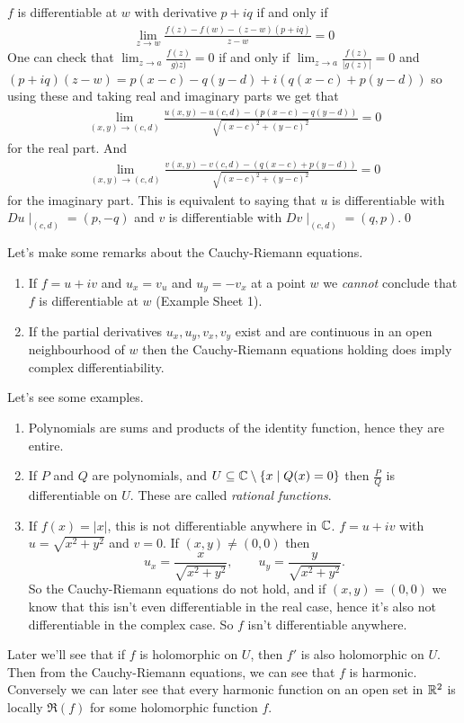 \documentclass{article}
\begin{document}
\pf $ f $ is differentiable at $ w $ with derivative $ p+iq $ if and only if
\begin{align*}
	\lim_{z\to w}\frac{f(z)-f(w) -(z-w)(p+iq)}{z-w} = 0
\end{align*}
One can check that $ \lim_{z\to a}\frac{f(z)}{g)z)}=0 $ if and only if $ \lim_{z\to a}\frac{f(z)}{|g(z)|} = 0 $ and $ (p+iq)(z-w) = p(x-c)-q(y-d)+i(q(x-c)+p(y-d)) $ so using these and taking real and imaginary parts we get that
\begin{align*}
	\lim_{(x,y)\to (c,d)} \frac{u(x,y)-u(c,d)-(p(x-c)-q(y-d))}{\sqrt{(x-c)^2+(y-c)^2}} = 0
\end{align*}
for the real part. And
\begin{align*}
	\lim_{(x,y)\to (c,d)}\frac{v(x,y)-v(c,d) - (q(x-c)+p(y-d))}{\sqrt{(x-c)^2+(y-c)^2}}=0
\end{align*}
for the imaginary part. This is equivalent to saying that $ u $ is differentiable with $ Du\mid_{(c,d)} = (p,-q) $ and $ v $ is differentiable with $ Dv\mid_{(c,d)} = (q,p) $.\qed
\begin{remark}
  Let's make some remarks about the Cauchy-Riemann equations.
  \begin{enumerate}
	  \item If $ f=u +iv $ and $ u_x=v_u $ and $ u_y = -v_x $ at a point $ w $ we \textit{cannot} conclude that $ f $ is differentiable at $ w $ (Example Sheet 1).
	  \item If the partial derivatives $ u_x,u_y,v_x,v_y $ exist and are continuous in an open neighbourhood of $ w $ then the Cauchy-Riemann equations holding does imply complex differentiability.
  \end{enumerate}
\end{remark}
Let's see some examples.
\begin{enumerate}
	\item Polynomials are sums and products of the identity function, hence they are entire.
	\item If $ P $ and $ Q $ are polynomials, and $ U\subseteq \mathbb{C}\setminus \{x\mid Q(x)= 0\} $ then $ \frac PQ $ is differentiable on $ U $. These are called \textit{rational functions}.
	\item If $ f(x)=|x| $, this is not differentiable anywhere in $ \mathbb{C} $. $ f=u+iv $ with $ u=\sqrt{x^2 +y^2} $ and $ v=0 $. If $ (x,y)\ne (0,0) $ then
		\[
			u_x=\frac{x}{\sqrt{x^2+y^2}}, \qquad u_y = \frac{y}{\sqrt{x^2+y^2}}.
		\]
		So the Cauchy-Riemann equations do not hold, and if $ (x,y)= (0,0) $ we know that this isn't even differentiable in the real case, hence it's also not differentiable in the complex case. So $ f $ isn't differentiable anywhere.
\end{enumerate}
\begin{remark}
  Later we'll see that if $ f $ is holomorphic on $ U $, then $ f' $ is also holomorphic on $ U $. Then from the Cauchy-Riemann equations, we can see that $ f $ is harmonic. Conversely we can later see that every harmonic function on an open set in $ \mathbb{R}^2 $ is locally $ \Re(f) $ for some holomorphic function $ f $.
\end{remark}
\end{document}
